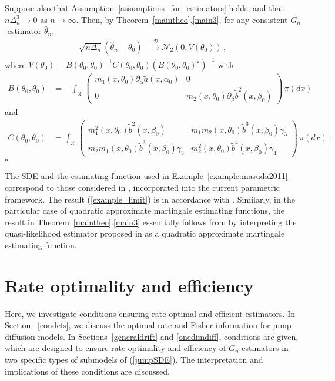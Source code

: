 \documentclass[11pt,a4paper]{article}
\newcommand{\thetan}{{\theta_0}}
\newcommand{\alphan}{{\alpha_0}}
\newcommand{\betan}{{\beta_0}}
\newcommand{\dd}{{\mathcal{D}}}
\newcommand{\nn}{{\mathcal{N}}}
\newcommand{\xx}{{\mathcal{X}}}
\newcommand{\cqed}{{\leavevmode \unskip \penalty9999 \hbox{} \nobreak \hfill \quad \hbox{$\circ$}}}
\numberwithin{equation}{section}
\numberwithin{theorem}{section}
\begin{document}
\begin{example}
Suppose also that Assumption~\ref{assumptions_for_estimators} holds, and that $n\Delta_n^3\to 0$ as $n\to \infty$. Then, by Theorem~\ref{maintheo}.\ref{main3}, for any consistent $G_n$-estimator $\hat{\theta}_n$,
\begin{align}
\sqrt{n\Delta_n} (\hat{\theta}_n-\thetan) &\overset{\dd}{\longrightarrow} \nn_2(0,V(\thetan))\,,
\label{example_limit}
\end{align}
where $V(\thetan) = B(\thetan, \thetan)^{-1}C(\thetan,\thetan)(B(\thetan,\thetan)^\star )^{-1}$ with
\begin{align*}
B(\thetan, \thetan) &= -\int_\xx \begin{pmatrix} m_1(x, \thetan)\partial_\alpha \tilde{a}(x, \alphan) & 0 \\ 0 & m_2(x, \thetan) \partial_\beta \tilde{b}^2(x, \betan) \end{pmatrix}\, \pi(dx)
\end{align*}
and
\begin{align*}
C(\thetan, \thetan) &= \int_\xx \begin{pmatrix} m_1^2(x, \thetan)\tilde{b}^2(x, \betan) & m_1 m_2(x, \thetan)\tilde{b}^3(x, \betan)\gamma_3 \\ m_2 m_1(x, \thetan)\tilde{b}^3(x, \betan)\gamma_3  & m_2^2(x, \thetan) \tilde{b}^4(x, \betan)\gamma_4 \end{pmatrix}\, \pi(dx)\,.
\end{align*}
\label{example:masuda2011}\cqed
\end{example}
%
The SDE and the estimating function used in Example~\ref{example:masuda2011} correspond to those considered in \cite{masuda2011}, incorporated into the current parametric framework. The result (\ref{example_limit}) is in accordance with \cite[Theorem 3.4]{masuda2011}. Similarly, in the particular case of 
quadratic approximate martingale estimating functions, the result in Theorem~\ref{maintheo}.\ref{main3} essentially follows from \cite[Theorem 2.9]{masuda2013} by interpreting the quasi-likelihood estimator proposed in \cite{masuda2013} as a quadratic approximate martingale estimating function.

\section{Rate optimality and efficiency}\label{sec:optimal_jump}
Here, we investigate conditions ensuring rate-optimal and efficient estimators. In Section~ \ref{condefs}, we discuss the optimal rate and Fisher information for jump-diffusion models. In Sections~\ref{generaldrift} and \ref{onedimdiff}, conditions are given, which are designed to ensure rate optimality and efficiency of $G_n$-estimators in two specific types of submodels of (\ref{jumpSDE}). The interpretation and implications of these conditions are discussed. \medskip
\end{document}
